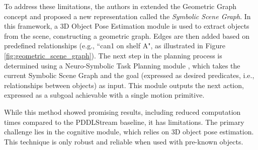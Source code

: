 To address these limitations, the authors in \cite{zhu2021hierarchical} extended the Geometric Graph concept and proposed a new representation called the \textit{Symbolic Scene Graph}. In this framework, a 3D Object Pose Estimation module is used to extract objects from the scene, constructing a geometric graph. Edges are then added based on predefined relationships (e.g., ``can1 on shelf A", as illustrated in Figure \ref{fig:geometric_scene_graph}). The next step in the planning process is determined using a Neuro-Symbolic Task Planning module \cite{xu2019regression}, which takes the current Symbolic Scene Graph and the goal (expressed as desired predicates, i.e., relationships between objects) as input. This module outputs the next action, expressed as a subgoal achievable with a single motion primitive.


While this method showed promising results, including reduced computation times compared to the PDDLStream \cite{garrett2020pddlstream} baseline, it has limitations. The primary challenge lies in the cognitive module, which relies on 3D object pose estimation. This technique is only robust and reliable when used with pre-known objects.

